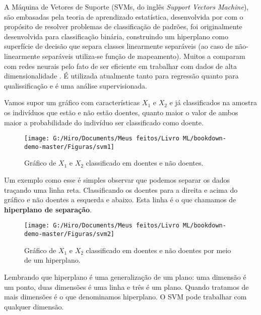 \documentclass[
  openany]{book}
\begin{document}
A Máquina de Vetores de Suporte (SVMs, do inglês \emph{Support Vectors Machine}), são embasadas pela teoria de aprendizado estatística, desenvolvida por \citet{vapnik2013nature} com o propósito de resolver problemas de classificação de padrões, foi originalmente desenvolvida para classificação binária, construindo um hiperplano como superfície de decisão que separa classes linearmente separáveis (ao caso de não-linearmente separáveis utiliza-se função de mapeamento). Muitos a comparam com redes neurais pelo fato de ser eficiente em trabalhar com dados de alta dimensionalidade \citep{sung2003identifying, ding2001multi}. É utilizada atualmente tanto para regressão quanto para qualissificação e é uma análise supervisionada.

Vamos supor um gráfico com características \(X_1\) e \(X_2\) e já classificados na amostra os indivíduos que estão e não estão doentes, quanto maior o valor de ambos maior a probabilidade do indivíduo ser classificado como doente.

\begin{figure}

{\centering \texttt{[image: G:/Hiro/Documents/Meus feitos/Livro ML/bookdown-demo-master/Figuras/svm1]} 

}

\caption{Gráfico de \(X_1\) e \(X_2\) classificado em doentes e não doentes.}\label{fig:svm1}
\end{figure}



Um exemplo como esse é simples observar que podemos separar os dados traçando uma linha reta. Classificando os doentes para a direita e acima do gráfico e não doentes a esquerda e abaixo. Esta linha é o que chamamos de \textbf{hiperplano de separação}.

\begin{figure}

{\centering \texttt{[image: G:/Hiro/Documents/Meus feitos/Livro ML/bookdown-demo-master/Figuras/svm2]} 

}

\caption{Gráfico de \(X_1\) e \(X_2\) classificado em doentes e não doentes por meio de um hiperplano.}\label{fig:svm2}
\end{figure}



Lembrando que hiperplano é uma generalização de um plano: uma dimensão é um ponto, duas dimensões é uma linha e três é um plano. Quando tratamos de mais dimensões é o que denominamos hiperplano. O SVM pode trabalhar com qualquer dimensão.
\end{document}
